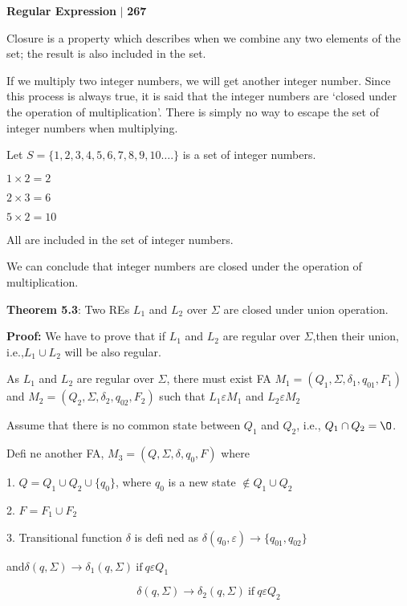 \documentclass[10pt,a4paper]{article}
\begin{document}
\small

\begin{flushright}
  \textsf{\textbf{Regular Expression}} $|$ \textbf{\textsf{267}}
\end{flushright}

Closure is a property which describes when we combine any two elements of the set; the result is
also included in the set.

If we multiply two integer numbers, we will get another integer number. Since this process is always
true, it is said that the integer numbers are ‘closed under the operation of multiplication’. There is simply
no way to escape the set of integer numbers when multiplying.

Let $S = \{1,2,3,4,5,6,7,8,9,10….\}$ is a set of integer numbers.

$1 × 2 = 2$

$2 × 3 = 6$

$5 × 2 = 10$

All are included in the set of integer numbers.

We can conclude that integer numbers are closed under the operation of multiplication.

\begin{flushleft}
  \textbf{Theorem 5.3}: Two REs $L_{1}$ and $L_{2}$ over $\Sigma$ are closed under union operation.

  \textrm{\textbf{Proof:}} We have to prove that if $L_{1}$ and $L_{2}$ are regular over $\Sigma$,then their union, i.e.,$L_{1} \cup L_{2}$ will be also regular.

As $L_{1}$ and $L_{2}$ are regular over $\Sigma$, there must exist FA $ M_{1} = (Q_{1}, \Sigma, \delta_{1}, q_{01}, F_{1}) $ and $ M_{2} = (Q_{2}, \Sigma , \delta_{2},q_{02}, F_{2})$ such that $L_{1} \varepsilon M_{1}$ and $L_{2} \varepsilon M_{2}$

Assume that there is no common state between $Q_{1}$ and $Q_{2}$, i.e., $Q_{1} \cap Q_{2} = {\O}$.

Defi ne another FA, $M_{3} = (Q, \Sigma, \delta, q_{0}, F)$ where

1. $Q = Q_{1} \cup Q_{2} \cup \{q_{0}\}$, where $q_{0}$ is a new state $\notin Q_{1} \cup Q_{2}$

2. $F = F_{1} \cup F_{2}$

3. Transitional function $\delta$ is defi ned as $\delta (q_{0}, \varepsilon) \rightarrow \{q_{01}, q_{02}\}$

and\qquad\qquad\qquad\qquad\qquad $\delta(q, \Sigma) \rightarrow \delta_{1}(q, \Sigma) \:\textrm{if}\: q \varepsilon Q_{1}$

$$\delta(q, \Sigma) \rightarrow \delta_{2}(q, \Sigma) \:\textrm{if}\: q \varepsilon Q_{2}$$

\end{flushleft}
\end{document}
